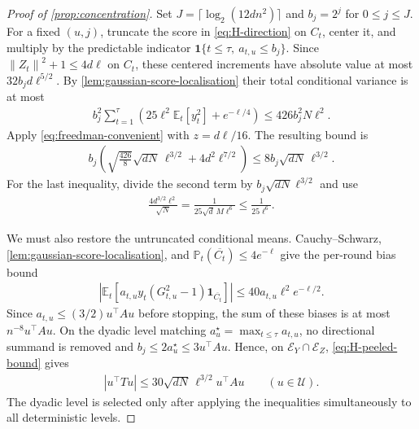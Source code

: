\documentclass{article}
\newcommand{\E}{\mathbb E}
\newcommand{\Pp}{\mathbb P}
\newcommand{\1}{\mathbf 1}
\newcommand{\norm}[1]{\left\lVert #1\right\rVert}
\begin{document}
\begin{proof}[Proof of \cref{prop:concentration}]
    Set $J=\lceil\log_2(12dn^2)\rceil$ and $b_j=2^j$ for
    $0\leq j\leq J$. For a fixed $(u,j)$, truncate the score in
    \eqref{eq:H-direction} on $C_t$, center it, and multiply by
    the predictable indicator
    $\1\{t\leq\tau,\ a_{t,u}\leq b_j\}$.
    Since $\norm{Z_t}^2+1\leq4d\ell$ on $C_t$, these centered increments
    have absolute value at most $32b_jd\ell^{5/2}$.
    By \cref{lem:gaussian-score-localisation} their total conditional
    variance is at most
    \begin{align}
        b_j^2\sum_{t=1}^\tau
        \left(25\ell^2\E_t[y_t^2]+e^{-\ell/4}\right)
        \leq426b_j^2N\ell^2.
        \label{eq:H-directional-predictable}
    \end{align}
    Apply \eqref{eq:freedman-convenient} with $z=d\ell/16$. The resulting
    bound is
    \begin{align}
        b_j\left(
        \sqrt{\frac{426}{8}}\sqrt{dN}\,\ell^{3/2}
        +4d^2\ell^{7/2}\right)
        \leq8b_j\sqrt{dN}\,\ell^{3/2}.
        \label{eq:H-peeled-bound}
    \end{align}
    For the last inequality, divide the second term by
    $b_j\sqrt{dN}\ell^{3/2}$ and use
    \begin{align}
        \frac{4d^{3/2}\ell^2}{\sqrt N}
        =\frac{1}{25\sqrt d\,M\ell^6}
        \leq\frac{1}{25\ell^6}.
    \end{align}

    We must also restore the untruncated conditional means.
    Cauchy--Schwarz, \cref{lem:gaussian-score-localisation}, and
    $\Pp_t(\overline{C_t})\leq4e^{-\ell}$ give the per-round bias bound
    \begin{align}
        \left|\E_t[a_{t,u}y_t(G_{t,u}^2-1)\1_{\overline{C_t}}]\right|
        \leq40a_{t,u}\ell^2 e^{-\ell/2}.
    \end{align}
    Since $a_{t,u}\leq(3/2)u^\top Au$ before stopping, the sum of these
    biases is at most $n^{-8}u^\top Au$.
    On the dyadic level matching $a_u^\star=\max_{t\leq\tau}a_{t,u}$,
    no directional summand is removed and
    $b_j\leq2a_u^\star\leq3u^\top Au$. Hence, on
    $\mathcal E_Y\cap\mathcal E_Z$, \eqref{eq:H-peeled-bound} gives
    \begin{align}
        |u^\top Tu|
        \leq30\sqrt{dN}\,\ell^{3/2}u^\top Au
        \qquad(u\in\mathcal U).
        \label{eq:H-net}
    \end{align}
    The dyadic level is selected only after applying the inequalities
    simultaneously to all deterministic levels.


\end{proof}
\end{document}
